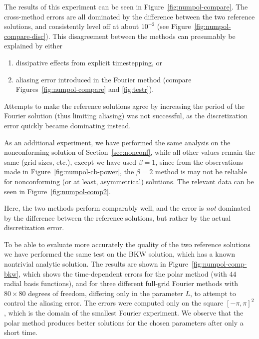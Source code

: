 The results of this experiment can be seen in Figure~\ref{fig:numpol-compare}. The cross-method errors
are all dominated by the difference between the two reference solutions, and consistently level off at about
$10^{-2}$ (see Figure~\ref{fig:numpol-compare-disc}). This disagreement between the methods can presumably be
explained by either
\begin{enumerate}
\renewcommand{\labelenumi}{(\roman{enumi})}
\item dissipative effects from explicit timestepping, or
\item aliasing error introduced in the Fourier method (compare Figures~\ref{fig:numpol-compare} and
\ref{fig:testr}).
\end{enumerate}

Attempts to make the reference solutions agree by increasing the period of the Fourier solution (thus limiting
aliasing) was not successful, as the discretization error quickly became dominating instead.

As an additional experiment, we have performed the same analysis on the nonconforming solution of
Section~\ref{sec:nonconf}, while all other values remain the same (grid sizes, etc.), except we have used
$\beta=1$, since from the observations made in Figure~\vref{fig:numpol-cb-power}, the $\beta=2$ method is
may not be reliable for nonconforming (or at least, asymmetrical) solutions. The relevant data can be seen in
Figure~\vref{fig:numpol-comp2}.

Here, the two methods perform comparably well, and the error is {\em not} dominated by the difference between
the reference solutions, but rather by the actual discretization error.

To be able to evaluate more accurately the quality of the two reference solutions we have performed the same
test on the BKW solution, which has a known nontrivial analytic solution. The results are shown in
Figure~\vref{fig:numpol-comp-bkw}, which shows the time-dependent errors for the polar method (with $44$ radial
basis functions), and for three different full-grid Fourier methods with $80\times80$ degrees of freedom,
differing only in the parameter $L$, to attempt to control the aliasing error. The errors were computed only
on the square $[-\pi,\pi]^2$, which is the domain of the smallest Fourier experiment. We observe that the
polar method produces better solutions for the chosen parameters after only a short time.

